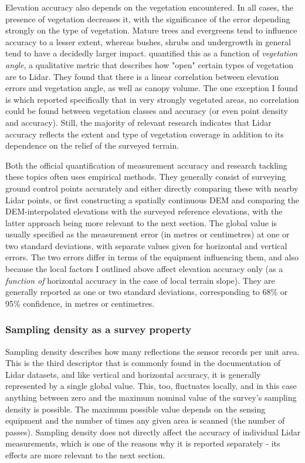 Elevation accuracy also depends on the vegetation encountered. In all cases, the presence of vegetation decreases it, with the significance of the error depending strongly on the type of vegetation. Mature trees and evergreens tend to influence accuracy to a lesser extent, whereas bushes, shrubs and undergrowth in general tend to have a decidedly larger impact. \cite{peng_shih_2006} quantified this as a function of \textit{vegetation angle}, a qualitative metric that describes how "open" certain types of vegetation are to Lidar. They found that there is a linear correlation between elevation errors and vegetation angle, as well as canopy volume. The one exception I found is \cite{raber_etal_2007} which reported specifically that in very strongly vegetated areas, no correlation could be found between vegetation classes and accuracy (or even point density and accuracy). Still, the majority of relevant research indicates that Lidar accuracy reflects the extent and type of vegetation coverage in addition to its dependence on the relief of the surveyed terrain.

Both the official quantification of measurement accuracy and research tackling these topics often uses empirical methods. They generally consist of surveying ground control points accurately and either directly comparing these with nearby Lidar points, or first constructing a spatially continuous DEM and comparing the DEM-interpolated elevations with the surveyed reference elevations, with the latter approach being more relevant to the next section. The global value is usually specified as the measurement error (in metres or centimetres) at one or two standard deviations, with separate values given for horizontal and vertical errors. The two errors differ in terms of the equipment influencing them, and also because the local factors I outlined above affect elevation accuracy only (as a \textit{function of} horizontal accuracy in the case of local terrain slope). They are generally reported as one or two standard deviations, corresponding to 68\% or 95\% confidence, in metres or centimetres.

\subsubsection{Sampling density as a survey property}

Sampling density describes how many reflections the sensor records per unit area. This is the third descriptor that is commonly found in the documentation of Lidar datasets, and like vertical and horizontal accuracy, it is generally represented by a single global value. This, too, fluctuates locally, and in this case anything between zero and the maximum nominal value of the survey's sampling density is possible. The maximum possible value depends on the sensing equipment and the number of times any given area is scanned (the number of passes). Sampling density does not directly affect the accuracy of individual Lidar measurements, which is one of the reasons why it is reported separately - its effects are more relevant to the next section.

